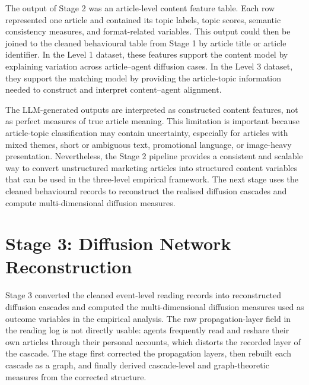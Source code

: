 The output of Stage 2 was an article-level content feature table. Each row represented one article and contained its topic labels, topic scores, semantic consistency measures, and format-related variables. This output could then be joined to the cleaned behavioural table from Stage 1 by article title or article identifier. In the Level 1 dataset, these features support the content model by explaining variation across article–agent diffusion cases. In the Level 3 dataset, they support the matching model by providing the article-topic information needed to construct and interpret content–agent alignment.

The LLM-generated outputs are interpreted as constructed content features, not as perfect measures of true article meaning. This limitation is important because article-topic classification may contain uncertainty, especially for articles with mixed themes, short or ambiguous text, promotional language, or image-heavy presentation. Nevertheless, the Stage 2 pipeline provides a consistent and scalable way to convert unstructured marketing articles into structured content variables that can be used in the three-level empirical framework. The next stage uses the cleaned behavioural records to reconstruct the realised diffusion cascades and compute multi-dimensional diffusion measures.

\section{Stage 3: Diffusion Network Reconstruction}
\label{sec:4-4-stage-3-diffusion-network-reconstruction}

Stage 3 converted the cleaned event-level reading records into reconstructed diffusion cascades and computed the multi-dimensional diffusion measures used as outcome variables in the empirical analysis. The raw propagation-layer field in the reading log is not directly usable: agents frequently read and reshare their own articles through their personal accounts, which distorts the recorded layer of the cascade. The stage first corrected the propagation layers, then rebuilt each cascade as a graph, and finally derived cascade-level and graph-theoretic measures from the corrected structure.

